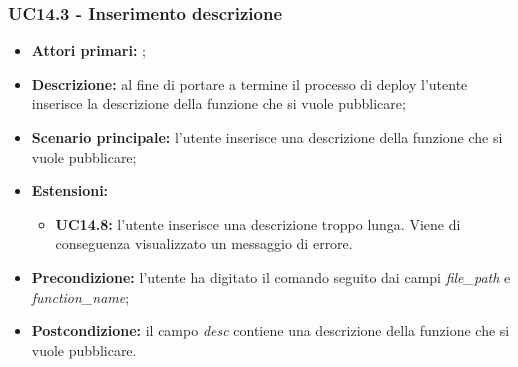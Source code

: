\subsubsection{UC14.3 - Inserimento descrizione}
\begin{itemize}
	\item \textbf{Attori primari:} \us{};
	\item \textbf{Descrizione:} al fine di portare a termine il processo di deploy l’utente inserisce la descrizione della funzione che si vuole pubblicare;  
	\item \textbf{Scenario principale:} l’utente inserisce una descrizione della funzione che si vuole pubblicare;  
	\item \textbf{Estensioni:} 
	\begin{itemize}
		\item \textbf{UC14.8:} l’utente inserisce una descrizione troppo lunga. Viene di conseguenza visualizzato un messaggio di errore. 
	\end{itemize}
	\item \textbf{Precondizione:}  l’utente ha digitato il comando \deploy{} seguito dai campi \textit{file\_path} e \textit{function\_name};
	\item \textbf{Postcondizione:} il campo \textit{desc} contiene una descrizione della funzione che si vuole pubblicare.
\end{itemize}